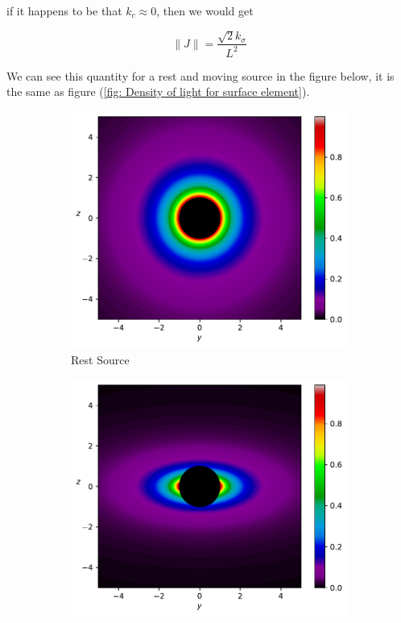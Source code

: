 if it happens to be that $k_c\approx 0$, then we would get

\begin{equation}
	\| J \| = \frac{ \sqrt{2} k_\sigma}{L^2}
\end{equation}

We can see this quantity for a rest and moving source in the figure below, it is the same as figure (\ref{fig: Density of light for surface element}).

\begin{figure}[H]
	\centering
	\begin{subfigure}{0.45\textwidth}
		\centering
		\includegraphics[width=\textwidth]{images/pdf/Density_of_Light_from_Rest_Source.pdf}
		\caption{Rest Source}
		\label{subfig_1: jacobian of vector density}
	\end{subfigure}
	\begin{subfigure}{0.45\textwidth}
		\centering
		\includegraphics[width=\textwidth]{images/pdf/Rate_of_Change_of_Vector_Density_of_Light_from_Moving_Source.pdf}

\end{subfigure}
\end{figure}
